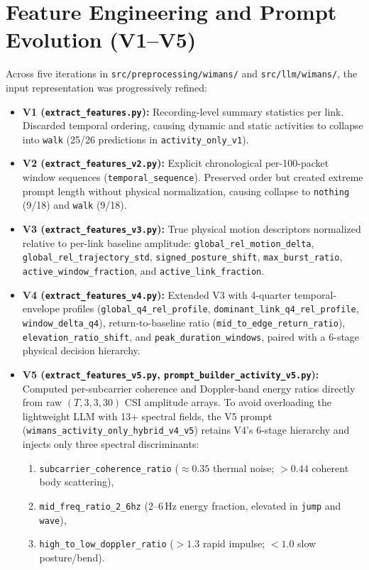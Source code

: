 \documentclass[11pt,a4paper]{article}
\begin{document}
\section{Feature Engineering and Prompt Evolution (V1--V5)}
Across five iterations in \texttt{src/preprocessing/wimans/} and \texttt{src/llm/wimans/}, the input representation was progressively refined:

\begin{itemize}
    \item \textbf{V1 (\texttt{extract\_features.py}):} Recording-level summary statistics per link. Discarded temporal ordering, causing dynamic and static activities to collapse into \texttt{walk} (25/26 predictions in \texttt{activity\_only\_v1}).
    \item \textbf{V2 (\texttt{extract\_features\_v2.py}):} Explicit chronological per-100-packet window sequences (\texttt{temporal\_sequence}). Preserved order but created extreme prompt length without physical normalization, causing collapse to \texttt{nothing} (9/18) and \texttt{walk} (9/18).
    \item \textbf{V3 (\texttt{extract\_features\_v3.py}):} True physical motion descriptors normalized relative to per-link baseline amplitude: \texttt{global\_rel\_motion\_delta}, \texttt{global\_rel\_trajectory\_std}, \texttt{signed\_posture\_shift}, \texttt{max\_burst\_ratio}, \texttt{active\_window\_fraction}, and \texttt{active\_link\_fraction}.
    \item \textbf{V4 (\texttt{extract\_features\_v4.py}):} Extended V3 with 4-quarter temporal-envelope profiles (\texttt{global\_q4\_rel\_profile}, \texttt{dominant\_link\_q4\_rel\_profile}, \texttt{window\_delta\_q4}), return-to-baseline ratio (\texttt{mid\_to\_edge\_return\_ratio}), \texttt{elevation\_ratio\_shift}, and \texttt{peak\_duration\_windows}, paired with a 6-stage physical decision hierarchy.
    \item \textbf{V5 (\texttt{extract\_features\_v5.py}, \texttt{prompt\_builder\_activity\_v5.py}):} Computed per-subcarrier coherence and Doppler-band energy ratios directly from raw $(T, 3, 3, 30)$ CSI amplitude arrays. To avoid overloading the lightweight LLM with 13+ spectral fields, the V5 prompt (\texttt{wimans\_activity\_only\_hybrid\_v4\_v5}) retains V4's 6-stage hierarchy and injects only three spectral discriminants:
    \begin{enumerate}
        \item \texttt{subcarrier\_coherence\_ratio} ($\approx 0.35$ thermal noise; $>0.44$ coherent body scattering),
        \item \texttt{mid\_freq\_ratio\_2\_6hz} (2--6\,Hz energy fraction, elevated in \texttt{jump} and \texttt{wave}),
        \item \texttt{high\_to\_low\_doppler\_ratio} ($>1.3$ rapid impulse; $<1.0$ slow posture/bend).
    \end{enumerate}
\end{itemize}
\end{document}
